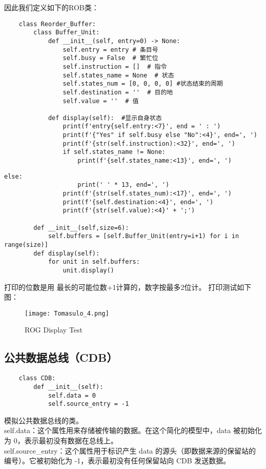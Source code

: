 \documentclass{article}
\begin{document}
因此我们定义如下的ROB类：
\begin{lstlisting}
    class Reorder_Buffer:
        class Buffer_Unit:
            def __init__(self, entry=0) -> None:
                self.entry = entry # 条目号
                self.busy = False  # 繁忙位
                self.instruction = []  # 指令
                self.states_name = None  # 状态
                self.states_num = [0, 0, 0, 0] #状态结束的周期
                self.destination = ''  # 目的地
                self.value = ''  # 值

            def display(self):  #显示自身状态
                print(f'entry{self.entry:<7}', end = ' : ')
                print(f'{"Yes" if self.busy else "No":<4}', end=', ')
                print(f'{str(self.instruction):<32}', end=', ')
                if self.states_name != None:
                    print(f'{self.states_name:<13}', end=', ')
\end{lstlisting}
\begin{lstlisting}[firstnumber=18]
                else:
                    print(' ' * 13, end=', ')
                print(f'{str(self.states_num):<17}', end=', ')
                print(f'{self.destination:<4}', end=', ')
                print(f'{str(self.value):<4}' + ';')

        def __init__(self,size=6):
            self.buffers = [self.Buffer_Unit(entry=i+1) for i in range(size)]
        def display(self):
            for unit in self.buffers:
                unit.display()
\end{lstlisting}
打印的位数是用 最长的可能位数+1计算的，数字按最多2位计。
打印测试如下图：
\begin{figure}[H]
    \centering
    \texttt{[image: Tomasulo\_4.png]}
    \caption{ROG Display Test}
    \label{fig: ROB Disp_Test}
\end{figure}
\subsection{公共数据总线（CDB）}
\begin{lstlisting}
    class CDB:
        def __init__(self):
            self.data = 0
            self.source_entry = -1
\end{lstlisting}
模拟公共数据总线的类。\\
self.data：这个属性用来存储被传输的数据。在这个简化的模型中，data 被初始化为 0，表示最初没有数据在总线上。\\
self.source\_entry：这个属性用于标识产生 data 的源头（即数据来源的保留站的编号）。它被初始化为 -1，表示最初没有任何保留站向 CDB 发送数据。
\newpage
\end{document}
